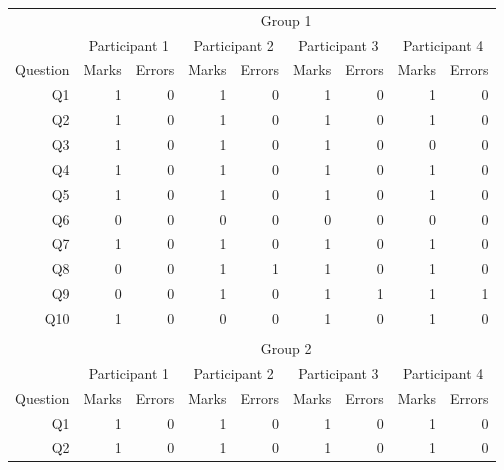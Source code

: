 \documentclass[12pt,twoside,notitlepage,xetex]{report}
\begin{document}
\begin{center}
\begin{table}[H]
\begin{center}
\begin{tabular}{|r||r|r||r|r||r|r||r|r|}
\cline{2-9}
\multicolumn{1}{c|}{} & \multicolumn{8}{c|}{Group 1}\\ \cline{2-9}
\multicolumn{1}{c|}{} & \multicolumn{2}{c||}{Participant 1} & \multicolumn{2}{c||}{Participant 2} & \multicolumn{2}{c||}{Participant 3} & \multicolumn{2}{c|}{Participant 4}\\ \hline
\multicolumn{1}{|c||}{Question} & \multicolumn{1}{c|}{Marks} & \multicolumn{1}{c||}{Errors} & \multicolumn{1}{c|}{Marks} & \multicolumn{1}{c||}{Errors} & \multicolumn{1}{c|}{Marks} & \multicolumn{1}{c||}{Errors} & \multicolumn{1}{c|}{Marks} & \multicolumn{1}{c|}{Errors}\\ \hline \hline
Q1 & 1 & 0 & 1 & 0 & 1 & 0 & 1 & 0\\ \hline
Q2 & 1 & 0 & 1 & 0 & 1 & 0 & 1 & 0\\ \hline
Q3 & 1 & 0 & 1 & 0 & 1 & 0 & 0 & 0\\ \hline
Q4 & 1 & 0 & 1 & 0 & 1 & 0 & 1 & 0\\ \hline
Q5 & 1 & 0 & 1 & 0 & 1 & 0 & 1 & 0\\ \hline
Q6 & 0 & 0 & 0 & 0 & 0 & 0 & 0 & 0\\ \hline
Q7 & 1 & 0 & 1 & 0 & 1 & 0 & 1 & 0\\ \hline
Q8 & 0 & 0 & 1 & 1 & 1 & 0 & 1 & 0\\ \hline
Q9 & 0 & 0 & 1 & 0 & 1 & 1 & 1 & 1\\ \hline
Q10 & 1 & 0 & 0 & 0 & 1 & 0 & 1 & 0\\ \hline
\multicolumn{9}{c}{}\\ \cline{2-9}
\multicolumn{1}{c|}{} & \multicolumn{8}{c|}{Group 2}\\ \cline{2-9}
\multicolumn{1}{c|}{} & \multicolumn{2}{c||}{Participant 1} & \multicolumn{2}{c||}{Participant 2} & \multicolumn{2}{c||}{Participant 3} & \multicolumn{2}{c|}{Participant 4}\\ \hline
\multicolumn{1}{|c||}{Question} & \multicolumn{1}{c|}{Marks} & \multicolumn{1}{c||}{Errors} & \multicolumn{1}{c|}{Marks} & \multicolumn{1}{c||}{Errors} & \multicolumn{1}{c|}{Marks} & \multicolumn{1}{c||}{Errors} & \multicolumn{1}{c|}{Marks} & \multicolumn{1}{c|}{Errors}\\ \hline \hline
Q1 & 1 & 0 & 1 & 0 & 1 & 0 & 1 & 0\\ \hline
Q2 & 1 & 0 & 1 & 0 & 1 & 0 & 1 & 0\\ \hline

\end{tabular}
\end{center}
\end{table}
\end{center}
\end{document}
